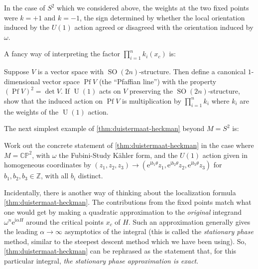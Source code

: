 \documentclass[12pt,letterpaper,reqno]{article}
\numberwithin{equation}{section}
\newcommand{\C}{\ensuremath{\mathbb C}}
\newcommand{\PP}{\ensuremath{\mathbb P}}
\newcommand{\Z}{\ensuremath{\mathbb Z}}
\newcommand{\kahler}{K\"ahler\xspace}
\newcommand{\I}{{\mathrm i}}
\newcommand{\e}{{\mathrm e}}
\newcommand{\ti}[1]{\textit{#1}}
\DeclareMathOperator{\SO}{SO}
\DeclareMathOperator{\U}{U}
\DeclareMathOperator{\Pf}{Pf}
\begin{document}
In the case of $S^2$ which we considered above, the weights at the two fixed points
were $k = +1$ and $k = -1$, the sign determined by whether the local orientation induced by the $U(1)$
action agreed or disagreed with the orientation induced by $\omega$.

A fancy way of interpreting the factor $\prod_{i=1}^n k_i(x_c)$ is:
\begin{exercise} Suppose $V$ is a vector space with $\SO(2n)$-structure.
Then define a canonical $1$-dimensional vector space $\Pf V$ (the ``Pfaffian line'')
with the property $(\Pf V)^2 = \det V$. If $\U(1)$ acts on $V$ preserving the $\SO(2n)$-structure,
show that the induced action on $\Pf V$ is multiplication by $\prod_{i=1}^n k_i$ where $k_i$
are the weights of the $\U(1)$ action.
\end{exercise}

The next simplest example of \autoref{thm:duistermaat-heckman} beyond $M = S^2$ is:

\begin{exercise} \label{ex:dh-cp2} Work out the concrete 
statement of \autoref{thm:duistermaat-heckman} in the case 
where $M = \C\PP^2$,
with $\omega$ the Fubini-Study \kahler form, 
and the $U(1)$ action given in homogeneous coordinates 
by $(z_1, z_2, z_3) \to (\e^{\I b_1 \theta} z_1, \e^{\I b_2 \theta} z_2, \e^{\I b_3 \theta} z_3)$ for $b_1, b_2, b_3 \in \Z$,
with all $b_i$ distinct.
\end{exercise}

Incidentally,
there is another way of thinking about 
the localization formula \autoref{thm:duistermaat-heckman}. 
The contributions from the fixed points match
what one would get
by making a quadratic approximation to the \ti{original} integrand 
$\omega^n \e^{\I \alpha H}$
around the critical points $x_c$
of $H$. Such an approximation generally gives the leading $\alpha \to \infty$
asymptotics of the integral (this is called the \ti{stationary phase} method,
similar to the steepest descent method which we have been using).
So, \autoref{thm:duistermaat-heckman} can be rephrased
as the statement that, for this particular integral,
 \ti{the stationary phase approximation is exact}.
\end{document}
